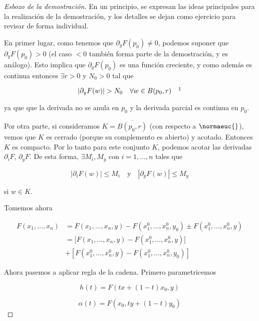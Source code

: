 \begin{proof}[Esbozo de la demostración]
    En un principio, se expresan las ideas principales para la realización de la demostración, y los detalles se dejan como ejercicio para revisar de forma individual.
    
    En primer lugar, como tenemos que $\partial_y F(p_0) \neq 0$, podemos suponer que $\partial_y F(p_0) > 0$ (el caso $< 0$ también forma parte de la demostración, y es análogo). Esto implica que $\partial_y F(p_0)$ es una función creciente, y como además es continua entonces $\exists r > 0$ y $N_0 > 0$ tal que
    
    \[
    \left| \partial_y F(w) \right| > N_0 \quad \forall w \in B(p_0, r) \quad \footnotemark
    \]
    
    \noindent ya que que la derivada no se anula en $p_0$ y la derivada parcial es continua en $p_0$.
    
    Por otra parte, si consideramos $K = \overline{B(p_0, r)}$ (con respecto a $\normaeuc{}$), vemos que $K$ es cerrado (porque su complemento es abierto) y acotado. Entonces $K$ es compacto. Por lo tanto para este conjunto $K$, podemos acotar las derivadas $\partial_i F$, $\partial_y F$. De esta forma, $\exists M_i, M_y$ con $i = 1, \dots, n$ tales que
    
    \begin{equation}\label{eq:3.1.1}
        \left| \partial_i F(w) \right| \leq M_i \quad \text{y} \quad \left| \partial_y F(w) \right| \leq M_y
    \end{equation}
    
    \noindent si $w \in K$.
    
    Tomemos ahora
    
    \begin{align*}
        F(x_1, \dots, x_n) &= F(x_1, \dots, x_n, y) - F(x_1^0, \dots, x_n^0, y_0) \pm F(x_1^0, \dots, x_n^0, y) \\
            &= \big[ F(x_1, \dots, x_n, y) - F(x_1^0, \dots, x_n^0, y) \big] \\
            &+ \left[ F(x_1^0, \dots, x_n^0, y) - F(x_1^0, \dots, x_n^0, y_0) \right]
    \end{align*}
    
    Ahora pasemos a aplicar regla de la cadena. Primero parametricemos
    
    \[
    h(t) = F\left(tx + (1-t)x_0, y\right)
    \]
    
    \[
    \alpha(t) = F\left(x_0, ty + (1-t)y_0\right)
    \]
    

\end{proof}
